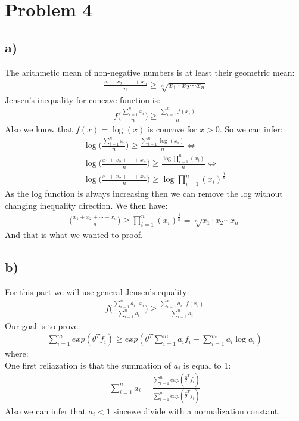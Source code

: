 \clearpage{}
\section*{Problem 4}
\subsection*{a)}
The arithmetic mean of non-negative numbers is at least their geometric mean:
\begin{align*}
\frac{x_1 + x_2 + \cdots + x_n}{n} \geq \sqrt[n]{x_1 \cdot  x_2  \cdots x_n}
\end{align*}
Jensen's inequality for concave function is:
\begin{align*}
f\bigg(\frac{\displaystyle\sum_{i=1}^{n}x_i}{n}\bigg) \geq \frac{\displaystyle\sum_{i=1}^{n}f(x_i)}{n}
\end{align*}
Also we know that $f(x) = \log(x)$ is concave for $x > 0$. So we can infer:
\begin{align*}
\log\bigg(\frac{\displaystyle\sum_{i=1}^{n}x_i}{n}\bigg) \geq \frac{\displaystyle\sum_{i=1}^{n}\log(x_i)}{n} \Leftrightarrow \\
\log\bigg(\frac{x_1 + x_2 + \cdots + x_n}{n}\bigg) \geq \frac{\log\displaystyle\prod_{i=1}^{n}(x_i)}{n} \Leftrightarrow \\
\log\bigg(\frac{x_1 + x_2 + \cdots + x_n}{n}\bigg) \geq \log\displaystyle\prod_{i=1}^{n}(x_i)^\frac{1}{n}
\end{align*}
As the log function is always increasing then we can remove the log without changing inequality direction.
We then have:
\begin{align*}
\bigg(\frac{x_1 + x_2 + \cdots + x_n}{n}\bigg) \geq \displaystyle\prod_{i=1}^{n}(x_i)^\frac{1}{n} = \sqrt[n]{x_1 \cdot  x_2  \cdots x_n}
\end{align*}
And that is what we wanted to proof.
\subsection*{b)}
For this part we will use general Jensen's equality:
\begin{align*}
f\bigg(\frac{\displaystyle\sum_{i=1}^{n}a_i \cdot x_i}{\displaystyle\sum_{i=1}^{n}a_i}\bigg) \geq \frac{\displaystyle\sum_{i=1}^{n}a_i\cdot f(x_i)}{\displaystyle\sum_{i=1}^{n}a_i}
\end{align*}
Our goal is to prove:
\begin{align}\label{eq:one}
\displaystyle\sum_{i=1}^{m}exp(\theta^T f_i) \geq exp(\theta^T \displaystyle\sum_{i=1}^{m}a_i f_i - \displaystyle\sum_{i=1}^{m}a_i\log a_i)
\end{align}
where:\\
One first reliazation is that the summation of $a_i$ is equal to 1:
\begin{align*}
\displaystyle\sum_{i=1}^{n}a_i = \frac{\displaystyle\sum_{i=1}^{n}exp(\hat{\theta}^T f_i)}{\displaystyle\sum_{i=1}^{m}exp(\hat{\theta}^T f_i)}
\end{align*}
Also we can infer that $a_i < 1$ sincewe divide with a normalization constant.\\

